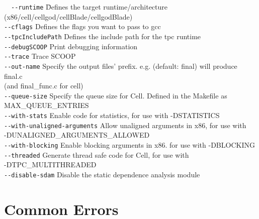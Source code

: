\documentclass[letterpaper]{article}
\begin{document}
  \begin{tabbing}
  \ \ \=\verb!--runtime!\hspace{9em} \=
  Defines the target runtime/architecture\\
                                    \>\>(x86/cell/cellgod/cellBlade/cellgodBlade)\\[1ex]
  \>\verb!--cflags!                   \>Defines the flags you want to pass to gcc\\[1ex]
  \>\verb!--tpcIncludePath!           \>Defines the include path for the tpc runtime\\[1ex]
  \>\verb!--debugSCOOP!               \>Print debugging information\\[1ex]
  \>\verb!--trace!                    \>Trace SCOOP\\[1ex]
  \>\verb!--out-name!                 \>Specify the output files' prefix. e.g. (default: final) will produce final.c\\
                                    \>\>(and final\_func.c for cell)\\[1ex]
  \>\verb!--queue-size!               \>Specify the queue size for Cell. Defined in the Makefile as\\
                                    \>\>MAX\_QUEUE\_ENTRIES\\[1ex]
  \>\verb!--with-stats!               \>Enable code for statistics, for use with -DSTATISTICS\\[1ex]
  \>\verb!--with-unaligned-arguments! \>Allow unaligned arguments in x86, for use with\\
                                    \>\>-DUNALIGNED\_ARGUMENTS\_ALLOWED\\[1ex]
  \>\verb!--with-blocking!            \>Enable blocking arguments in x86. for use with -DBLOCKING\\[1ex]
  \>\verb!--threaded!                 \>Generate thread safe code for Cell, for use with\\
                                    \>\>-DTPC\_MULTITHREADED\\[1ex]
  \>\verb!--disable-sdam!             \>Disable the static dependence analysis module
  \end{tabbing}

\section{Common Errors}
\end{document}
